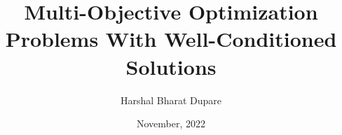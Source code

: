 \documentclass[12pt,a4paper,twoside]{iitgthesis}%
\begin{document}
\title{Multi-Objective Optimization Problems With Well-Conditioned Solutions}
\author{Harshal Bharat Dupare}
\date{November, 2022}
\maketitle





\begin{romanpages}



%



\tableofcontents
\end{romanpages}




% 
% 

% 

%




% 




\renewcommand{\bibname}{References}

\end{document}
